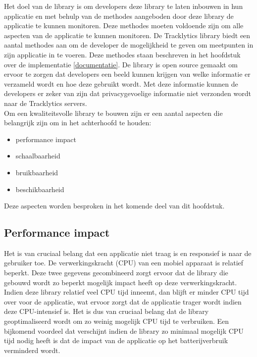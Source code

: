 \noindent Het doel van de library is om developers deze library te laten inbouwen in hun applicatie en met behulp van de methodes aangeboden door deze library de applicatie te kunnen monitoren. Deze methodes moeten voldoende zijn om alle aspecten van de applicatie te kunnen monitoren. De Tracklytics library biedt een aantal methodes aan om de developer de mogelijkheid te geven om meetpunten in zijn applicatie in te voeren. Deze methodes staan beschreven in het hoofdstuk over de implementatie \ref{documentatie}. De library is open source gemaakt om ervoor te zorgen dat developers een beeld kunnen krijgen van welke informatie er verzameld wordt en hoe deze gebruikt wordt. Met deze informatie kunnen de developers er zeker van zijn dat privacygevoelige informatie niet verzonden wordt naar de Tracklytics servers.\\

Om een kwaliteitsvolle library te bouwen zijn er een aantal aspecten die belangrijk zijn om in het achterhoofd te houden:
\begin{itemize}
\item performance impact
\item schaalbaarheid
\item bruikbaarheid
\item beschikbaarheid
\end{itemize}

Deze aspecten worden besproken in het komende deel van dit hoofdstuk. 

\subsection{Performance impact}
Het is van cruciaal belang dat een applicatie niet traag is en responsief is naar de gebruiker toe. De verwerkingskracht (CPU) van een mobiel apparaat is relatief beperkt. Deze twee gegevens gecombineerd zorgt ervoor dat de library die gebouwd wordt zo beperkt mogelijk impact heeft op deze verwerkingskracht. Indien deze library relatief veel CPU tijd inneemt, dan blijft er minder CPU tijd over voor de applicatie, wat ervoor zorgt dat de applicatie trager wordt indien deze CPU-intensief is. Het is dus van cruciaal belang dat de library geoptimaliseerd wordt om zo weinig mogelijk CPU tijd te verbruiken. Een bijkomend voordeel dat verschijnt indien de library zo minimaal mogelijk CPU tijd nodig heeft is dat de impact van de applicatie op het batterijverbruik verminderd wordt.  \\

